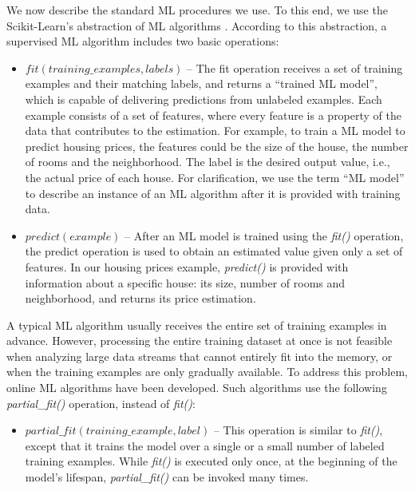 We now describe the standard ML
procedures we use. To this end, we use the Scikit-Learn's abstraction of
ML algorithms \cite{pedregosa2011scikit}. According to this abstraction, a supervised ML
algorithm includes two basic operations:
		
		\begin{itemize}
			\item $fit(training\_examples, labels)$ -- The fit operation receives a set of training examples and their matching labels, and returns a ``trained ML model'', which is capable of delivering predictions from unlabeled examples. Each example consists of a set of features, where every feature is a property of the data that contributes to the estimation. For example, to train a ML model to predict housing prices, the features could be the size of the house, the number of rooms and the neighborhood. The label is the desired output value, i.e., the actual price of each house. For clarification, we use the term ``ML model'' to describe an instance of an ML algorithm after it is provided with training data.  
			
			\item $predict(example)$ -- After an ML model is trained using the \emph{fit()} operation, the predict operation is used to obtain an estimated value given only a set of features. In our housing prices example, \emph{predict()} is provided with information about a specific house: its size, number of rooms and neighborhood, and returns its price estimation.
		\end{itemize}
		
		A typical ML algorithm usually receives the entire set of training examples in advance. However, processing the entire training dataset at once is not feasible when analyzing large data streams that cannot entirely fit into the memory, or when the training examples are only gradually available. To address this problem, online ML algorithms have been developed. Such algorithms use the following \emph{partial\_fit()} operation, instead of \emph{fit()}:
		\begin{itemize}
			\item $partial\_fit(training\_example, label)$ -- This operation is similar to \emph{fit()}, except that it trains the model over a single or a small number of labeled training examples. While \emph{fit()} is executed only once, at the beginning of the model's lifespan, \emph{partial\_fit()} can be invoked many times.
		\end{itemize}
		
